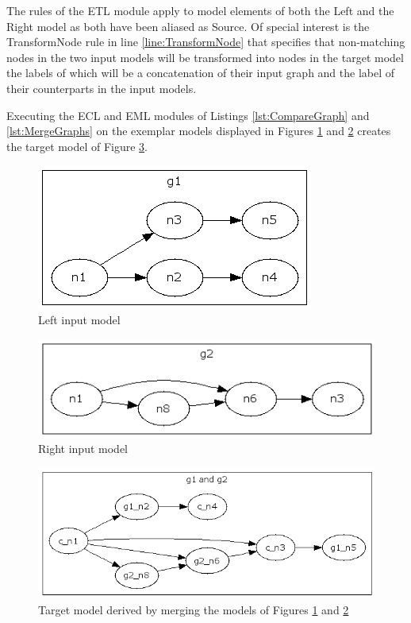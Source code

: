 The rules of the ETL module apply to model elements of both the Left and the Right model as both have been aliased as Source. Of special interest is the TransformNode rule in line \ref{line:TransformNode} that specifies that non-matching nodes in the two input models will be transformed into nodes in the target model the labels of which will be a concatenation of their input graph and the label of their counterparts in the input models.

Executing the ECL and EML modules of Listings \ref{lst:CompareGraph} and \ref{lst:MergeGraphs} on the exemplar models displayed in Figures \ref{fig:LeftGraph} and \ref{fig:RightGraph} creates the target model of Figure \ref{fig:TargetGraph}.

\begin{figure}
	\centering
		\includegraphics{images/LeftGraph.png}
	\caption{Left input model}
	\label{fig:LeftGraph}
\end{figure}


\begin{figure}
	\centering
		\includegraphics{images/RightGraph.png}
	\caption{Right input model}
	\label{fig:RightGraph}
\end{figure}


\begin{figure}
	\centering
		\includegraphics{images/MergedGraph.png}
	\caption{Target model derived by merging the models of Figures \ref{fig:LeftGraph} and \ref{fig:RightGraph}}
	\label{fig:TargetGraph}
\end{figure}
